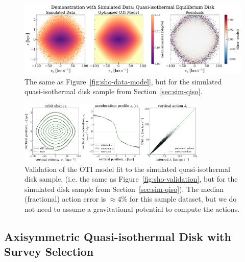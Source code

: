 \begin{figure}[t!]
\begin{center}
\includegraphics[width=\textwidth]{qiso-data-model.pdf}
\end{center}
\caption{%
The same as Figure~\ref{fig:sho-data-model}, but for the simulated quasi-isothermal disk
sample from Section~\ref{sec:sim-qiso}.
\label{fig:qiso-data-model}
}
\end{figure}

\begin{figure}[t!]
\begin{center}
\includegraphics[width=0.8\textwidth]{qiso-validation.pdf}
\end{center}
\caption{%
Validation of the OTI model fit to the simulated quasi-isothermal disk sample. (i.e. the
same as Figure~\ref{fig:sho-validation}, but for the simulated disk sample from
Section~\ref{sec:sim-qiso}).
The median (fractional) action error is $\approx 4\%$ for this sample dataset, but we do
not need to assume a gravitational potential to compute the actions.
\label{fig:qiso-validation}
}
\end{figure}

\subsection{Axisymmetric Quasi-isothermal Disk with Survey Selection}
\label{sec:sim-qiso-sel}

